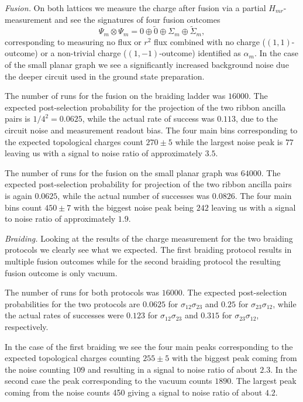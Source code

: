 \documentclass[a4paper,twocolumn,11pt]{quantumarticle}
\begin{document}
\emph{Fusion.} 
On both lattices we measure the charge after fusion via a partial $H_{mr}$-measurement and see the signatures of four fusion outcomes
$$\Psi_m \otimes \Psi_m = 0 \oplus \tilde 0 \oplus \Sigma_m \oplus \tilde{\Sigma}_m,$$
corresponding to measuring no flux or $r^2$ flux combined with no charge ($(1,1)$-outcome) or a non-trivial charge ($(1,-1)$-outcome) identified as $\alpha_m$.
In the case of the small planar graph we see a significantly 
increased background noise due the deeper circuit used in the ground state preparation.

The number of runs for the fusion on the braiding ladder was $16000$. The expected post-selection probability for the projection of the two ribbon ancilla pairs is $1/4^2=0.0625$, while the actual rate of success was $0.113$, due to the circuit noise and measurement readout bias. The four main bins corresponding to the expected topological charges count $270\pm5$ while the largest noise peak is $77$ leaving us with a signal to noise ratio of approximately $3.5$. 

The number of runs for the fusion on the small planar graph was $64000$. The expected post-selection probability for projection of the two ribbon ancilla pairs is again $0.0625$, while the actual number of successes was $0.0826$. The four main bins count $450\pm7$ with the biggest noise peak being $242$ leaving us with a signal to noise ratio of approximately $1.9$.

\emph{Braiding.}
Looking at the results of the charge measurement for the two braiding protocols we clearly see what we expected. The first braiding protocol results in multiple fusion outcomes while for the second braiding protocol the resulting fusion outcome is only vacuum.


The number of runs for both protocols was $16000$. The expected post-selection probabilities for the two protocols are $0.0625$ for $\sigma_{12}\sigma_{23}$ and $0.25$ for $\sigma_{23}\sigma_{12}$, while the actual rates of successes were $0.123$ for $\sigma_{12}\sigma_{23}$ and $0.315$ for $\sigma_{23}\sigma_{12}$, respectively.

In the case of the first braiding we see the four main peaks corresponding to the expected topological charges counting $255\pm 5$ with the biggest peak coming from the noise counting $109$ and resulting in a signal to noise ratio of about $2.3$. In the second case the peak corresponding to the vacuum counts $1890$. The largest peak coming from the noise counts 450 giving a signal to noise ratio of about $4.2$.
\end{document}
